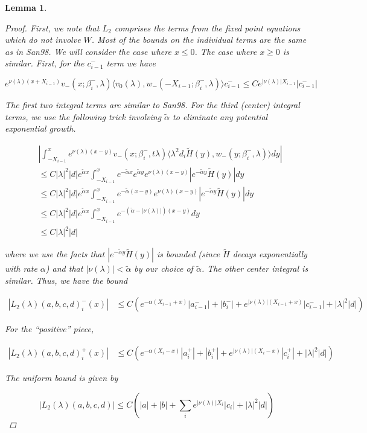 \documentclass[12pt]{article}
\newtheorem{lemma}{Lemma}
\begin{document}
\begin{lemma}
\begin{proof}
First, we note that $L_2$ comprises the terms from the fixed point equations which do not involve $W$. Most of the bounds on the individual terms are the same as in San98. We will consider the case where $x \leq 0$. The case where $x \geq 0$ is similar. First, for the $c_{i-1}^-$ term we have

\[
e^{\nu(\lambda)(x+X_{i-1})} v_-(x; \beta_i^-, \lambda) \langle v_0(\lambda), w_-(-X_{i-1}; \beta_i^-, \lambda) \rangle c_{i-1}^- \leq C e^{|\nu(\lambda)| X_{i-1} }|c_{i-1}^-|
\]

The first two integral terms are similar to San98. For the third (center) integral terms, we use the following trick involving $\tilde{\alpha}$ to eliminate any potential exponential growth.

\begin{align*}
&\left| \int_{-X_{i-1}}^x 
e^{\nu(\lambda)(x-y)} v_-(x; \beta_i^-,t \lambda) \langle \lambda^2 d_i \tilde{H}(y), w_-(y; \beta_i^-, \lambda) \rangle dy \right| \\
&\leq C |\lambda|^2 |d| e^{\tilde{\alpha}x} \int_{-X_{i-1}}^x e^{-\tilde{\alpha}x} e^{\tilde{\alpha}y} e^{\nu(\lambda)(x-y)} |e^{-\tilde{\alpha}y}\tilde{H}(y)|dy \\
&\leq C |\lambda|^2 |d| e^{\tilde{\alpha}x} \int_{-X_{i-1}}^x e^{-\tilde{\alpha}(x-y)} e^{\nu(\lambda)(x-y)} |e^{-\tilde{\alpha}y}\tilde{H}(y)| dy \\
&\leq C |\lambda|^2 |d| e^{\tilde{\alpha}x} \int_{-X_{i-1}}^x e^{-(\tilde{\alpha} - |\nu(\lambda)|)(x-y)} dy \\
&\leq C |\lambda|^2 |d|
\end{align*}

where we use the facts that $|e^{-\tilde{\alpha}y}\tilde{H}(y)|$ is bounded (since $\tilde{H}$ decays exponentially with rate $\alpha$) and that $|\nu(\lambda)| < \tilde{\alpha}$ by our choice of $\tilde{\alpha}$. The other center integral is similar. Thus, we have the bound 

\begin{align*}
|L_2(\lambda)(a,b,c,d)_i^-(x)| &\leq C (e^{-\alpha(X_{i-1} + x)}|a_{i-1}^-| + |b_i^-| + e^{|\nu(\lambda)|(X_{i-1} + x)} |c_{i-1}^-| + |\lambda|^2 |d| )
\end{align*}

For the ``positive'' piece,

\begin{align*}
|L_2(\lambda)(a,b,c,d)_i^+(x)| &\leq C (e^{-\alpha(X_i - x)}|a_i^+| + |b_i^+| + e^{|\nu(\lambda)|(X_i - x)} |c_i^+| + |\lambda|^2 |d| ) 
\end{align*}

The uniform bound is given by

\[
|L_2(\lambda)(a,b,c,d)| \leq C \left(|a| + |b| + \sum_i e^{|\nu(\lambda)|X_i}|c_i| + |\lambda|^2 |d| \right)
\]

\end{proof}
\end{lemma}
\end{document}
